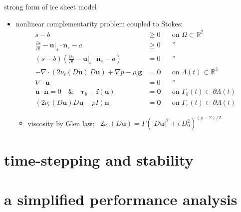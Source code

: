 \documentclass[svgnames,
               hyperref={colorlinks,citecolor=DeepPink4,linkcolor=FireBrick,urlcolor=Maroon},
               usepdftitle=false]  %
               {beamer}
\newcommand{\eps}{\epsilon}
\newcommand{\RR}{\mathbb{R}}
\newcommand{\bbf}{\mathbf{f}}
\newcommand{\bn}{\mathbf{n}}
\newcommand{\bu}{\mathbf{u}}
\newcommand{\btau}{\bm{\tau}}
\newcommand{\bzero}{\bm{0}}
\newcommand{\rhoi}{\rho_{\text{i}}}
\newcommand{\pp}{{\text{p}}}
\begin{document}
\begin{frame}{strong form of ice sheet model}

\begin{itemize}
\item nonlinear complementarity problem coupled to Stokes:
\begin{align*}
s - b &\ge 0 && \text{on $\Omega \subset \RR^2$} \\
\frac{\partial s}{\partial t} - \bu|_s \cdot \bn_s - a &\ge 0 && \text{''} \\
(s - b) \left(\frac{\partial s}{\partial t} - \bu|_s \cdot \bn_s - a\right) &= 0 && \text{''} \\
- \nabla \cdot \left(2 \nu_\eps(D\bu)\, D\bu\right) + \nabla p - \rhoi \mathbf{g} &= \bzero && \text{on $\Lambda(t) \subset \RR^3$} \\
\nabla \cdot \bu &= 0 && \text{''} \\
\bu\cdot \bn = 0 \quad \& \quad \btau_b - \bbf(\bu) &= \bzero && \text{on $\Gamma_b(t) \subset \partial \Lambda(t)$} \\
\left(2 \nu_\eps(D\bu) D\bu - pI\right) \bn &= \bzero && \text{on $\Gamma_s(t) \subset \partial \Lambda(t)$}
\end{align*}

    \begin{itemize}
    \item viscosity by Glen law: \, $2\nu_\eps(D\bu) = \Gamma \left(|D\bu|^2 + \eps\, D_0^2\right)^{(\pp-2)/2}$
    \end{itemize}
\end{itemize}
\end{frame}


\section{time-stepping and stability}



\section{a simplified performance analysis}
\end{document}
